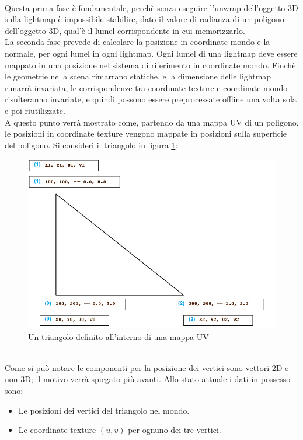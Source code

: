 \\
Questa prima fase è fondamentale, perchè senza eseguire l’unwrap dell’oggetto 3D sulla lightmap è impossibile stabilire, dato il valore di radianza di un poligono dell’oggetto 3D, qual’è il lumel corrispondente in cui memorizzarlo.
\\
La seconda fase prevede di calcolare la posizione in coordinate mondo e la normale, per ogni lumel in ogni lightmap.
Ogni lumel di una lightmap deve essere mappato in una posizione nel sistema di riferimento in coordinate mondo. Finchè le geometrie nella scena rimarrano statiche, e la dimensione delle lightmap rimarrà invariata, le corrispondenze tra coordinate texture e coordinate mondo risulteranno invariate, e quindi possono essere preprocessate offline una volta sola e poi riutilizzate.
\\
A questo punto verrà mostrato come, partendo da una mappa UV di un poligono, le posizioni in coordinate texture vengono mappate in posizioni sulla superficie del poligono.
Si consideri il triangolo in figura \ref{fig:stato_arte_ligh_triangle1}: 
\\
\begin{figure}[htb]
 \centering
 \includegraphics[width=1\linewidth]{images/chapter_stato_arte/stato_arte_ligh_triangle1.png}\hfill
 \caption[Triangolo di esempio per mapping UV]{Un triangolo definito all'interno di una mappa UV}
 \label{fig:stato_arte_ligh_triangle1}
\end{figure}
\\
Come si può notare le componenti per la posizione dei vertici sono vettori 2D e non 3D; il motivo verrà spiegato più avanti.
Allo stato attuale i dati in possesso sono:	
\begin{itemize}
\item Le posizioni dei vertici del triangolo nel mondo.
\item Le coordinate texture $(u,v)$ per ognuno dei tre vertici.
\end{itemize}
